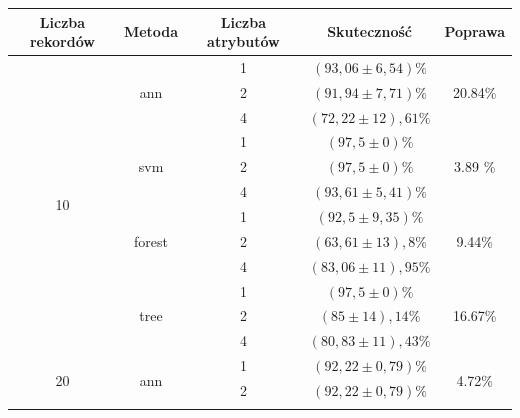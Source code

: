 \begin{table}[]
\tiny
\centering
\begin{tabular}{|c|c|c|c|c|}
\hline
Liczba rekordów       & Metoda                  & Liczba atrybutów & Skuteczność & Poprawa \\ \hline
\multirow{12}{*}{10}  & \multirow{3}{*}{ann}    & 1                & $ (93,06  \pm  6,54) \% $ & \multirow{3}{*}{20.84\%} \\ \cline{3-4} 
                      &                         & 2                & $ (91,94 \pm 7,71) \% $   & \\ \cline{3-4} 
                      &                         & 4                & $ (72,22 \pm 12),61 \% $  & \\ \cline{2-5} 
                      & \multirow{3}{*}{svm}    & 1                & $ (97,5 \pm 0) \% $        & \multirow{3}{*}{3.89 \%} \\ \cline{3-4} 
                      &                         & 2                & $ (97,5 \pm 0) \% $       &\\ \cline{3-4} 
                      &                         & 4                & $ (93,61 \pm 5,41) \% $   &\\ \cline{2-5} 
                      & \multirow{3}{*}{forest} & 1                & $ (92,5 \pm 9,35) \% $    & \multirow{3}{*}{9.44\%} \\ \cline{3-4} 
                      &                         & 2                & $ (63,61 \pm 13),8 \% $   &\\ \cline{3-4} 
                      &                         & 4                & $ (83,06 \pm 11),95 \% $ & \\ \cline{2-5} 
                      & \multirow{3}{*}{tree}   & 1                & $ (97,5 \pm 0) \% $       & \multirow{3}{*}{16.67\%} \\ \cline{3-4} 
                      &                         & 2                & $ (85 \pm  14),14 \% $    & \\ \cline{3-4} 
                      &                         & 4                & $ (80,83 \pm 11),43 \% $  &\\ \hline
\multirow{12}{*}{20}  & \multirow{3}{*}{ann}    & 1                & $ (92,22 \pm 0,79) \% $   & \multirow{3}{*}{4.72\%} \\ \cline{3-4} 
                      &                         & 2                & $ (92,22 \pm 0,79) \% $   &\\ \cline{3-4} 

\end{tabular}
\end{table}
